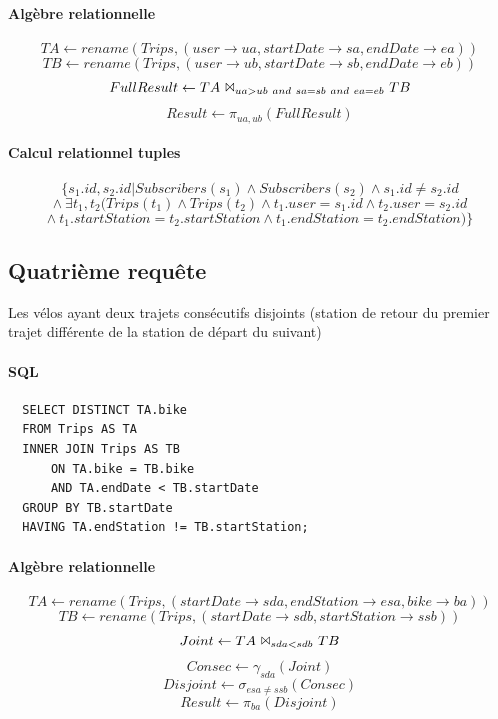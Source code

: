 \documentclass[a4paper]{article}
\begin{document}
	\paragraph{Algèbre relationnelle}
    $$ TA \leftarrow rename(Trips, (user \rightarrow ua, startDate \rightarrow sa, endDate \rightarrow ea)) $$
    $$ TB \leftarrow rename(Trips, (user \rightarrow ub, startDate \rightarrow sb, endDate \rightarrow eb)) $$
    $$ FullResult \leftarrow TA\ \Bowtie_{ua>ub\ and\ sa=sb\ and\ ea=eb}\ TB$$
    $$ Result \leftarrow \pi_{ua, ub} (FullResult) $$

	\paragraph{Calcul relationnel tuples}
    $$ \{ s_1.id, s_2.id | Subscribers(s_1) \land Subscribers(s_2) \land s_1.id \neq s_2.id $$
    $$ \land\ \exists t_1, t_2 (Trips(t_1) \land Trips(t_2) \land t_1.user = s_1.id \land t_2.user = s_2.id $$
    $$ \land\ t_1.startStation = t_2.startStation \land t_1.endStation = t_2.endStation) \} $$



\subsection{Quatrième requête}
	Les vélos ayant deux trajets consécutifs disjoints (station de retour du premier trajet différente de la station de départ du suivant)

	\paragraph{SQL}
  \begin{verbatim}
  SELECT DISTINCT TA.bike
  FROM Trips AS TA
  INNER JOIN Trips AS TB
      ON TA.bike = TB.bike
      AND TA.endDate < TB.startDate
  GROUP BY TB.startDate
  HAVING TA.endStation != TB.startStation;
  \end{verbatim}
  
  	\paragraph{Algèbre relationnelle}
    $$ TA \leftarrow rename(Trips, (startDate \rightarrow sda, endStation \rightarrow esa, bike \rightarrow ba)) $$
    $$ TB \leftarrow rename(Trips, (startDate \rightarrow sdb, startStation \rightarrow ssb)) $$
    $$ Joint \leftarrow TA\ \Bowtie_{sda < sdb}\ TB $$
    $$ Consec \leftarrow \gamma_{sda}(Joint) $$
    $$ Disjoint \leftarrow \sigma_{esa \neq ssb}(Consec)$$
    $$ Result \leftarrow \pi_{ba}(Disjoint)$$
    
\end{document}
